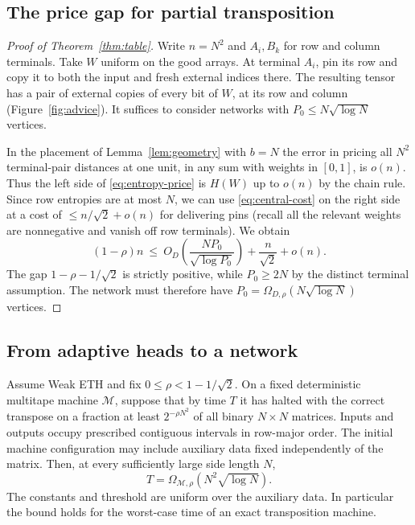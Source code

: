 \subsection{The price gap for partial transposition}

\begin{proof}[Proof of Theorem~\ref{thm:table}]
Write $n=N^2$ and $A_i,B_k$ for row and column terminals.
Take $W$ uniform on the good arrays. At terminal $A_i$, pin
its row and copy it to both the input and fresh external indices
there. The resulting tensor has a pair of external copies of every
bit of $W$, at its row and column (Figure~\ref{fig:advice}).
It suffices to consider networks with $P_0\le N\sqrt{\log N}$ vertices.

In the placement of Lemma~\ref{lem:geometry} with $b=N$ the error in pricing all
$N^2$ terminal-pair distances at one unit, in any sum with weights in $[0,1]$,
is $o(n)$. Thus the left side of \eqref{eq:entropy-price} is
$H(W)$ up to $o(n)$ by the chain rule. Since row entropies are at most
$N$, we can use \eqref{eq:central-cost} on the right side at a cost of
$\le n/\sqrt2+o(n)$ for delivering pins (recall all the relevant weights
are nonnegative and vanish off row terminals). We obtain
\[
 (1-\rho)n \ \le\
 O_D\!\left(\frac{N P_0}{\sqrt{\log P_0}}\right)+\frac n{\sqrt2}+o(n).
\]
The gap $1-\rho-1/\sqrt2$ is strictly positive, while $P_0\ge 2N$
by the distinct terminal assumption. The network must therefore have
$P_0=\Omega_{D,\rho}(N\sqrt{\log N})$ vertices.
\end{proof}



\subsection{From adaptive heads to a network}

\begin{theorem}\label{thm:transpose}
Assume Weak ETH and fix $0\le\rho<1-1/\sqrt2$. On a fixed deterministic
multitape machine $\mathcal M$, suppose that by time
$T$ it has halted with the correct transpose on a fraction at least
$2^{-\rho N^2}$ of all binary $N\times N$ matrices. Inputs and outputs occupy prescribed contiguous
intervals in row-major order. The initial machine configuration may
include auxiliary data fixed independently of the matrix. Then, at
every sufficiently large side length $N$,
\[
                 T=\Omega_{\mathcal M,\rho}(N^2\sqrt{\log N}).
\]
The constants and threshold are uniform over the auxiliary data.
In particular the bound holds for the worst-case time of an exact
transposition machine.
\end{theorem}

